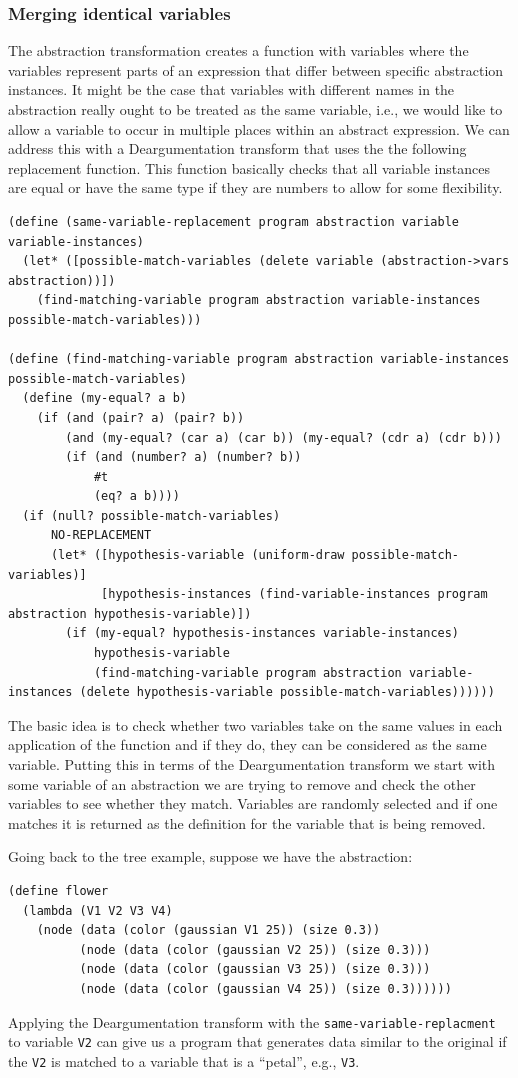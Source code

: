 \documentclass[a4paper,10pt]{article}
\begin{document}
\subsubsection{Merging identical variables}
The abstraction transformation creates a function with variables where the variables represent parts of an expression that differ between specific abstraction instances.  It might be the case that variables with different names in the abstraction really ought to be treated as the same variable, i.e., we would like to allow a variable to occur in multiple places within an abstract expression.  We can address this with a Deargumentation transform that uses the the following replacement function.  This function basically checks that all variable instances are equal or have the same type if they are numbers to allow for some flexibility.
\begin{lstlisting}[frame=trbl]
(define (same-variable-replacement program abstraction variable variable-instances)
  (let* ([possible-match-variables (delete variable (abstraction->vars abstraction))])
    (find-matching-variable program abstraction variable-instances possible-match-variables)))

(define (find-matching-variable program abstraction variable-instances possible-match-variables)
  (define (my-equal? a b) 
    (if (and (pair? a) (pair? b)) 
        (and (my-equal? (car a) (car b)) (my-equal? (cdr a) (cdr b))) 
        (if (and (number? a) (number? b))
            #t
            (eq? a b)))) 
  (if (null? possible-match-variables)
      NO-REPLACEMENT
      (let* ([hypothesis-variable (uniform-draw possible-match-variables)]
             [hypothesis-instances (find-variable-instances program abstraction hypothesis-variable)])
        (if (my-equal? hypothesis-instances variable-instances)
            hypothesis-variable
            (find-matching-variable program abstraction variable-instances (delete hypothesis-variable possible-match-variables))))))
\end{lstlisting}
The basic idea is to check whether two variables take on the same values in each application of the function and if they do, they can be considered as the same variable.  Putting this in terms of the Deargumentation transform we start with some variable of an abstraction we are trying to remove and check the other variables to see whether they match.  Variables are randomly selected and if one matches it is returned as the definition for the variable that is being removed.  

Going back to the tree example, suppose we have the abstraction:
\begin{lstlisting}
(define flower
  (lambda (V1 V2 V3 V4)
    (node (data (color (gaussian V1 25)) (size 0.3))
          (node (data (color (gaussian V2 25)) (size 0.3)))
          (node (data (color (gaussian V3 25)) (size 0.3)))
          (node (data (color (gaussian V4 25)) (size 0.3))))))
\end{lstlisting}
Applying the Deargumentation transform with the \texttt{same-variable-replacment} to variable \texttt{V2} can give us a program that generates data similar to the original if the \texttt{V2} is matched to a variable that is a ``petal'', e.g., \texttt{V3}.
\end{document}
